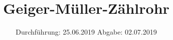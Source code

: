 

\subject{V703}
\title{Geiger-Müller-Zählrohr}
\date{%
Durchführung: {25.06.2019}
\hspace{3em}
Abgabe: {02.07.2019}
}



\maketitle
\thispagestyle{empty}
\tableofcontents
\newpage





\printbibliography{}

